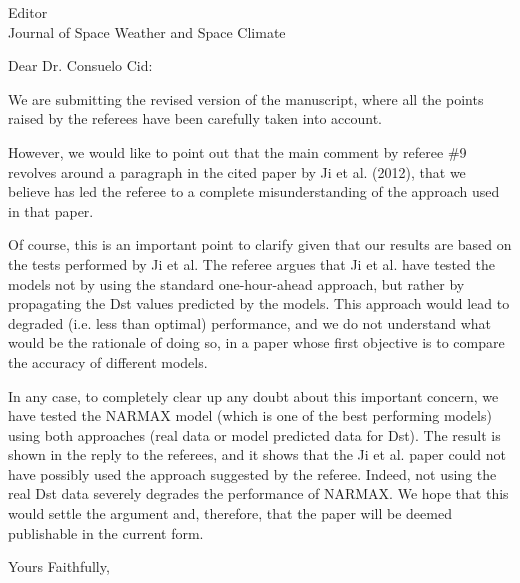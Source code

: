 \documentclass{letter}
\begin{document}
\begin{letter}{Editor \\ Journal of Space Weather and Space Climate}
\opening{Dear Dr. Consuelo Cid:}

We are submitting the revised version of the manuscript, where all the points raised by the referees have been carefully taken into account.

However, we would like to point out that the main comment by referee \#9 revolves around a paragraph in the cited paper by Ji et al. (2012), that we believe has led the referee to a complete misunderstanding of the approach used in that paper.

Of course, this is an important point to clarify given that our results are based on the tests performed by Ji et al. The referee argues that Ji et al. have tested the models not by using the standard one-hour-ahead approach, but rather by propagating the Dst values predicted by the models. This approach would lead to degraded (i.e. less than optimal) performance, and we do not understand what would be the rationale of doing so, in a paper whose first objective is to compare the accuracy of different models.

In any case, to completely clear up any doubt about this important concern, we have tested the NARMAX model (which is one of the best performing models) using both approaches (real data or model predicted data for Dst). The result is shown in the reply to the referees, and it shows that the Ji et al. paper could not have possibly used the approach suggested by the referee. Indeed, not using the real Dst data severely degrades the performance of NARMAX.
We hope that this would settle the argument and, therefore,  that the paper will be deemed publishable in the current form.

\closing{Yours Faithfully,}


\end{letter}
\end{document}
